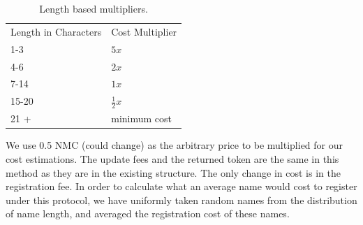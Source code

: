 \begin{table}[t]
  \centering
  \begin{tabular}{| l | l |} \hline
    Length in Characters & Cost Multiplier \\
    1-3 & \( 5 x \) \\
    4-6 & \( 2 x \) \\
    7-14 & \( 1 x \) \\
    15-20 & \( \frac{1}{2} x \) \\
    21 + & minimum cost \\ \hline
  \end{tabular}
  \caption{Length based multipliers.}
\end{table}




    We use 0.5 NMC (could change) as the arbitrary price to be multiplied for our cost estimations. The update fees and the returned token are the same in this method as they are in the existing structure. The only change in cost is in the registration fee. In order to calculate what an average name would cost to register under this protocol, we have uniformly taken random names from the distribution of name length, and averaged the registration cost of these names. 



